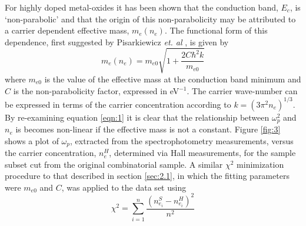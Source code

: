 \documentclass[final,5p,times]{elsarticle}
\begin{document}
For highly doped metal-oxides it has been shown that the conduction band, $E_c$, is `non-parabolic' and that the origin of this non-parabolicity may be attributed to a carrier dependent effective mass, $m_e(n_e)$. The functional form of this dependence, first suggested by Pisarkiewicz \textit{et. al} \cite{Pisarkiewicz1990}, is given by
\begin{equation}
\label{eqn:3}
m_e(n_e) = m_{e0}\sqrt{1+\frac{2C\hbar^2k}{m_{e0}}}
\end{equation}
where $m_{e0}$ is the value of the effective mass at the conduction band minimum and $C$ is the non-parabolicity factor, expressed in eV$^{-1}$. The carrier wave-number can be expressed in terms of the carrier concentration according to $k = (3\pi^2n_e)^{1/3}$. By re-examining equation \ref{eqn:1} it is clear that the relationship between $\omega_p^2$ and $n_e$ is becomes non-linear if the effective mass is not a constant. Figure \ref{fig:3} shows a plot of $\omega_{p}$, extracted from the spectrophotometry measurements, versus the carrier concentration, $n_e^H$, determined via Hall measurements, for the sample subset cut from the original combinatorial sample. A similar $\chi^2$ minimization procedure to that described in section \ref{sec:2.1}, in which the fitting parameters were $m_{e0}$ and $C$, was applied to the data set using
\begin{equation}\label{eqn:4}
\chi^2 = \sum_{i=1}^n\frac{(n_{e_i}^S-n_{e_i}^H)^2}{n^2}
\end{equation}
\end{document}
